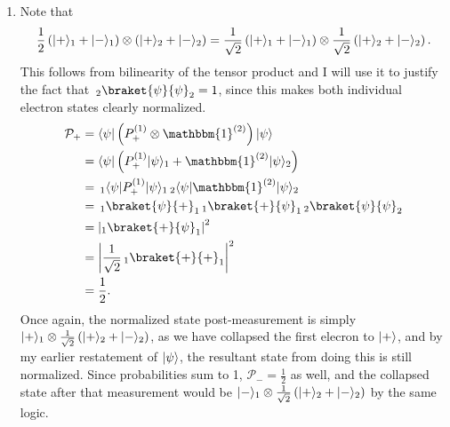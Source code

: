 \documentclass[11pt, letterpaper]{article}
\begin{document}
\begin{enumerate}
	\item Note that
		\[
			\frac{1}{2} \left( \lvert+\rangle_1+\lvert-\rangle_1 \right) \otimes \left( \lvert+\rangle_2 +\lvert-\rangle_2 \right) =\frac{1}{\sqrt{2} } \left( \lvert+\rangle_1+\lvert-\rangle_1 \right) \otimes \frac{1}{\sqrt{2} } \left( \lvert+\rangle_2+\lvert-\rangle_2 \right) 
		.\]
		This follows from bilinearity of the tensor product and I will use it to justify the fact that $\,_2\braket{\psi }{\psi }_2 =1$, since this makes both individual electron states clearly normalized.
		\begin{align*}
			\mathcal{P}_+&=\bra{\psi } \left( P_+^{(1)} \otimes \mathbbm{1}^{(2)}  \right) \ket{\psi } \\
				     &=\bra{\psi } \left( P_+^{(1)} \ket{\psi }_1+\mathbbm{1}^{(2)} \ket{\psi }_2 \right) \\
				     &=\,_1\bra{\psi }P_+^{(1)}\ket{\psi }_1\,_2\bra{\psi }\mathbbm{1}^{(2)} \ket{\psi }_2\\
				     &=\,_1\braket{\psi }{+}_1\,_1\braket{+}{\psi }_1\,_2\braket{\psi }{\psi }_2\\
				     &=\left|_1 \braket{+}{\psi }_1 \right|^2\\
				     &=\left| \frac{1}{\sqrt{2} }\,_1 \braket{+}{+}_1  \right|^2\\
				     &=\frac{1}{2} 
		.\end{align*}
		Once again, the normalized state post-measurement is simply $\lvert+\rangle_1 \otimes \frac{1}{\sqrt{2} } \left( \lvert+\rangle_2+\lvert-\rangle_2 \right) $, as we have collapsed the first elecron to $\lvert+\rangle $, and by my earlier restatement of $\lvert\psi \rangle $, the resultant state from doing this is still normalized. Since probabilities sum to 1, $\mathcal{P}_-=\frac{1}{2} $ as well, and the collapsed state after that measurement would be $\lvert-\rangle_1 \otimes \frac{1}{\sqrt{2} } \left( \lvert+\rangle_2+\lvert-\rangle_2 \right) $ by the same logic.


\end{enumerate}
\end{document}
